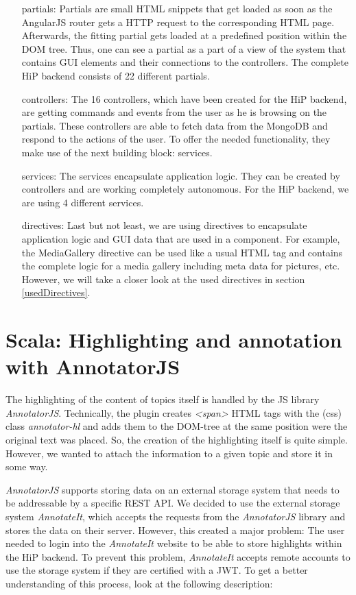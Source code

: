 \begin{itemize}
	\item[partials:] Partials are small \ac{HTML} snippets that get loaded as soon as the AngularJS router gets a \ac{HTTP} request to the corresponding \ac{HTML} page. Afterwards, the fitting partial gets loaded at a predefined position within the \ac{DOM} tree. Thus, one can see a partial as a part of a view of the system that contains \ac{GUI} elements and their connections to the controllers.  The complete \ac{HiP} backend consists of 22 different partials.  
	\item[controllers:] The 16 controllers, which have been created for the \ac{HiP} backend, are getting commands and events from the user as he is browsing on the partials. These controllers are able to fetch data from the MongoDB and respond to the actions of the user. To offer the needed functionality, they make use of the next building block: services.  
	\item[services:] The services encapsulate application logic. They can be created by controllers and are working completely autonomous. For the \ac{HiP} backend, we are using 4 different services.
	\item[directives:] Last but not least, we are using directives to encapsulate application logic and \ac{GUI} data that are used in a component. For example, the MediaGallery directive can be used like a usual \ac{HTML} tag and contains the complete logic for a media gallery including meta data for pictures, etc. However, we will take a closer look at the used directives in section \ref{usedDirectives}.
\end{itemize}

\section{Scala: Highlighting and annotation with AnnotatorJS}
The highlighting of the content of topics itself is handled by the \ac{JS} library \emph{AnnotatorJS}. Technically, the plugin creates \emph{<span>} \ac{HTML} tags with the (css) class \emph{annotator-hl} and adds them to the \ac{DOM}-tree at the same position were the original text was placed. So, the creation of the highlighting itself is quite simple. However, we wanted to attach the information to a given topic and store it in some way.  

\emph{AnnotatorJS} supports storing data on an external storage system that needs to be addressable by a specific \ac{REST} \ac{API}. We decided to use the external storage system \emph{AnnotateIt}, which accepts the requests from the \emph{AnnotatorJS} library and stores the data on their server. However, this created a major problem: The user needed to login into the \emph{AnnotateIt} website to be able to store highlights within the \ac{HiP} backend. To prevent this problem, \emph{AnnotateIt} accepts remote accounts to use the storage system if they are certified with a \ac{JWT}. To get a better understanding of this process, look at the following description:


